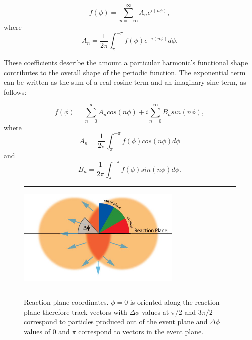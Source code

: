\begin{equation}
f(\phi) = \sum^{\infty}_{n=-\infty} A_{n} e^{i(n \phi)},
\end{equation}
where
\begin{equation}
A_{n} = \frac{1}{2\pi} \int^{-\pi}_{\pi} f(\phi) e^{-i(n \phi)} d\phi.
\end{equation}

These coefficients describe the amount a particular harmonic's functional shape contributes to the overall shape of the periodic function. The exponential term can be written as the sum of a real cosine term and an imaginary sine term, as follows:

\begin{equation}
f(\phi) = \sum^{\infty}_{n=0} A_{n} cos ( n \phi) + i \sum^{\infty}_{n=0} B_{n} sin (n \phi),
\end{equation}
where
\begin{equation}
A_{n} = \frac{1}{2\pi} \int^{-\pi}_{\pi} f(\phi) cos (n \phi) d\phi
\end{equation}
and
\begin{equation}
B_{n} = \frac{1}{2\pi} \int^{-\pi}_{\pi} f(\phi) sin (n \phi) d\phi.
\end{equation}

\begin{figure}[htbp!]
  \centering
  \rule{35em}{0.5pt}
    \includegraphics[width=0.7\textwidth]{Figures/RP_InOutPlane_3.jpg}
        
  \caption[Reaction plane coordinates.]{Reaction plane coordinates. $\phi = 0$ is oriented along the reaction plane therefore track vectors with $\Delta\phi$ values at $\pi/2$ and $3 \pi / 2$ correspond to particles produced out of the event plane and $\Delta\phi$ values of $0$ and $\pi$ correspond to vectors in the event plane.}
  \rule{35em}{0.5pt}
  \label{fig:dphiep}
\end{figure}



